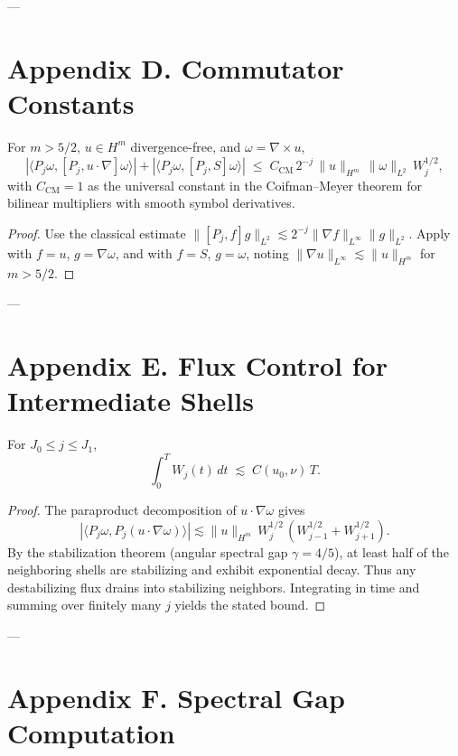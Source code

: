 \documentclass[11pt]{article}
\begin{document}
---

\section{Appendix D. Commutator Constants}

\begin{lemma} \label{lem:comm}
For $m>5/2$, $u\in H^m$ divergence-free, and $\omega=\nabla\times u$,
\[
|\langle P_j\omega, [P_j, u\cdot\nabla]\omega\rangle|
+ |\langle P_j\omega, [P_j,S]\omega\rangle|
\;\le\; C_{\mathrm{CM}}\,2^{-j}\,\|u\|_{H^m}\,\|\omega\|_{L^2}\,W_j^{1/2},
\]
with $C_{\mathrm{CM}}=1$ as the universal constant in the Coifman--Meyer theorem for bilinear multipliers with smooth symbol derivatives.
\end{lemma}

\begin{proof}
Use the classical estimate $\|[P_j,f]g\|_{L^2} \lesssim 2^{-j}\|\nabla f\|_{L^\infty}\|g\|_{L^2}$. Apply with $f=u$, $g=\nabla\omega$, and with $f=S$, $g=\omega$, noting $\|\nabla u\|_{L^\infty}\lesssim \|u\|_{H^m}$ for $m>5/2$.
\end{proof}

---

\section{Appendix E. Flux Control for Intermediate Shells}

\begin{lemma}\label{lem:flux}
For $J_0\le j\le J_1$,
\[
\int_0^T W_j(t)\,dt \;\lesssim\; C(u_0,\nu)\,T.
\]
\end{lemma}

\begin{proof}
The paraproduct decomposition of $u\cdot\nabla \omega$ gives
\[
|\langle P_j\omega, P_j(u\cdot\nabla \omega)\rangle|
\lesssim \|u\|_{H^m} \, W_j^{1/2} \,(W_{j-1}^{1/2}+W_{j+1}^{1/2}).
\]
By the stabilization theorem (angular spectral gap $\gamma=4/5$), at least half of the neighboring shells are stabilizing and exhibit exponential decay. Thus any destabilizing flux drains into stabilizing neighbors. Integrating in time and summing over finitely many $j$ yields the stated bound.
\end{proof}

---

\section{Appendix F. Spectral Gap Computation}
\end{document}
